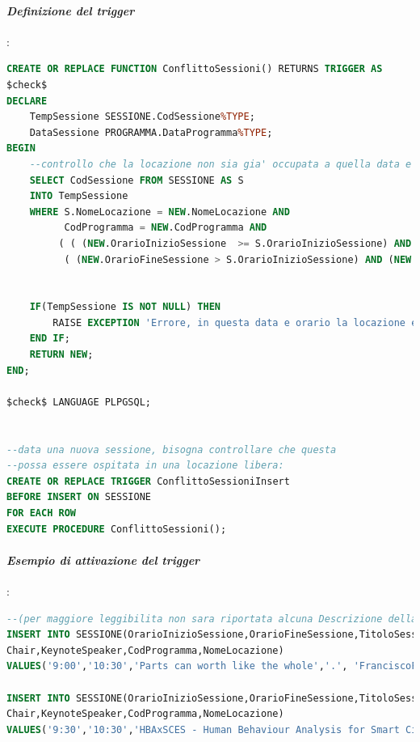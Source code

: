 \documentclass[a4page]{article}
\begin{document}
\paragraph{\textit{Definizione del trigger}}:
\begin{lstlisting}[language=SQL,
        deletekeywords={IDENTITY,INT},
        morekeywords={clustered},    
        framesep=10pt,
        framextopmargin=10pt]
CREATE OR REPLACE FUNCTION ConflittoSessioni() RETURNS TRIGGER AS
$check$
DECLARE 
	TempSessione SESSIONE.CodSessione%TYPE;
	DataSessione PROGRAMMA.DataProgramma%TYPE;		
BEGIN
	--controllo che la locazione non sia gia' occupata a quella data e ora
	SELECT CodSessione FROM SESSIONE AS S
	INTO TempSessione
	WHERE S.NomeLocazione = NEW.NomeLocazione AND			
		  CodProgramma = NEW.CodProgramma AND
		 ( ( (NEW.OrarioInizioSessione  >= S.OrarioInizioSessione) AND (NEW.OrarioInizioSessione  < S.OrarioFineSessione) ) OR
		  ( (NEW.OrarioFineSessione > S.OrarioInizioSessione) AND (NEW.OrarioFineSessione <= S.OrarioFineSessione) ) );
		  
	
	IF(TempSessione IS NOT NULL) THEN
		RAISE EXCEPTION 'Errore, in questa data e orario la locazione e occupata';
	END IF;
	RETURN NEW;
END;

$check$ LANGUAGE PLPGSQL;		


--data una nuova sessione, bisogna controllare che questa
--possa essere ospitata in una locazione libera:
CREATE OR REPLACE TRIGGER ConflittoSessioniInsert
BEFORE INSERT ON SESSIONE
FOR EACH ROW
EXECUTE PROCEDURE ConflittoSessioni();          
\end{lstlisting}
\paragraph{\textit{Esempio di attivazione del trigger}}:
\begin{lstlisting}[language=SQL,
        deletekeywords={IDENTITY,INT},
        morekeywords={clustered},    
        framesep=10pt,
        framextopmargin=10pt]
--(per maggiore leggibilita non sara riportata alcuna Descrizione della sessione).
INSERT INTO SESSIONE(OrarioInizioSessione,OrarioFineSessione,TitoloSessione,DescrizioneSessione,
Chair,KeynoteSpeaker,CodProgramma,NomeLocazione)
VALUES('9:00','10:30','Parts can worth like the whole','.', 'FranciscoFlorez-Revuelta@gmail.com','NicolaLerme@unipa.it',0,'Teatrino');
	   
INSERT INTO SESSIONE(OrarioInizioSessione,OrarioFineSessione,TitoloSessione,DescrizioneSessione,
Chair,KeynoteSpeaker,CodProgramma,NomeLocazione)
VALUES('9:30','10:30','HBAxSCES - Human Behaviour Analysis for Smart City Environment Safety','.','JonAnderGomezAdrian@gmail.com','GiovanniRana@gmail.com',0,'Teatrino');
\end{lstlisting}
\end{document}

